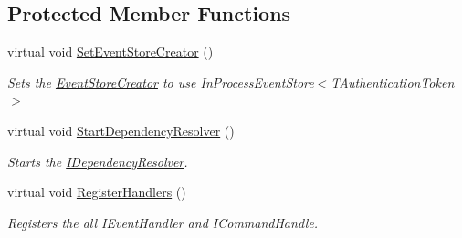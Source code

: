 \subsection*{Protected Member Functions}
\begin{DoxyCompactItemize}
\item 
virtual void \hyperlink{classCqrs_1_1Configuration_1_1SampleRuntime_a08ac580aad6ab03f16fd3171f21dfe59_a08ac580aad6ab03f16fd3171f21dfe59}{Set\+Event\+Store\+Creator} ()
\begin{DoxyCompactList}\small\item\em Sets the \hyperlink{classCqrs_1_1Configuration_1_1SampleRuntime_a9038dd478bcafb2f5f65cbcbada712db_a9038dd478bcafb2f5f65cbcbada712db}{Event\+Store\+Creator} to use In\+Process\+Event\+Store$<$\+T\+Authentication\+Token$>$ \end{DoxyCompactList}\item 
virtual void \hyperlink{classCqrs_1_1Configuration_1_1SampleRuntime_a1593df9e75becc36fee1f15b2be14ec4_a1593df9e75becc36fee1f15b2be14ec4}{Start\+Dependency\+Resolver} ()
\begin{DoxyCompactList}\small\item\em Starts the \hyperlink{interfaceCqrs_1_1Configuration_1_1IDependencyResolver}{I\+Dependency\+Resolver}. \end{DoxyCompactList}\item 
virtual void \hyperlink{classCqrs_1_1Configuration_1_1SampleRuntime_a001d4810823f11dee9144834182f8e05_a001d4810823f11dee9144834182f8e05}{Register\+Handlers} ()
\begin{DoxyCompactList}\small\item\em Registers the all I\+Event\+Handler and I\+Command\+Handle. \end{DoxyCompactList}\end{DoxyCompactItemize}

